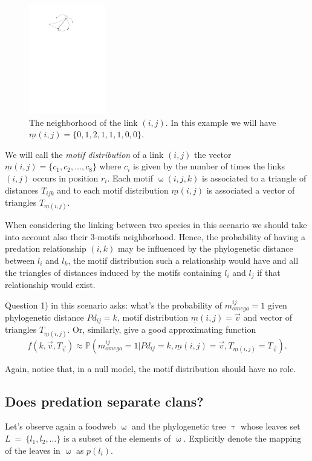 \documentclass[12pt,a4paper]{report}
\begin{document}
\begin{figure}[h]
	\centering
		\includegraphics[width=0.3\textwidth]{images/starij}
		\caption{The neighborhood of the link $(i,j)$. In this example we will have $\underline{m}(i,j)=\{0,1,2,1,1,1,0,0\}$.}
		\label{fig:starij}
\end{figure}

We will call the \emph{motif distribution} of a link $(i,j)$ the vector $\underline{m}(i,j)=\{c_1,c_2,\dots,c_8\}$ where $c_i$ is given by the number of times the links $(i,j)$ occurs in position $r_i$. Each motif $\upomega(i,j,k)$ is associated to a triangle of distances $T_{ijk}$ and to each motif distribution $\underline{m}(i,j)$ is associated a vector of triangles $T_{\underline{m}(i,j)}$.

When considering the linking between two species in this scenario we should take into account also their 3-motifs neighborhood. Hence, the probability of having a predation relationship $(i,k)$ may be influenced by the phylogenetic distance between $l_i$ and $l_k$, the motif distribution such a relationship would have and all the triangles of distances induced by the motifs containing $l_i$ and $l_j$ if that relationship would exist.

Question 1) in this scenario asks: what's the probability of $m_{omega}^{ij} = 1$ given phylogenetic distance $Pd_{ij}=k$, motif distribution $\underline{m}(i,j)=\vec{v}$ and vector of triangles $T_{\underline{m}(i,j)}$. Or, similarly, give a good approximating function \[f(k,\vec{v},T_{\vec{v}}) \approx \mathbb{P}(m_{omega}^{ij} = 1 | Pd_{ij}=k, \underline{m}(i,j)=\vec{v}, T_{\underline{m}(i,j)}=T_{\vec{v}}).\]

Again, notice that, in a null model, the motif distribution should have no role.

\subsection{Does predation separate clans?}
Let's observe again a foodweb $\upomega$ and the phylogenetic tree $\uptau$ whose leaves set $L~=~\{l_1, l_2, \dots\}$ is a subset of the elements of $\upomega$. Explicitly denote the mapping of the leaves in $\upomega$ as $p(l_i)$. 
\end{document}
